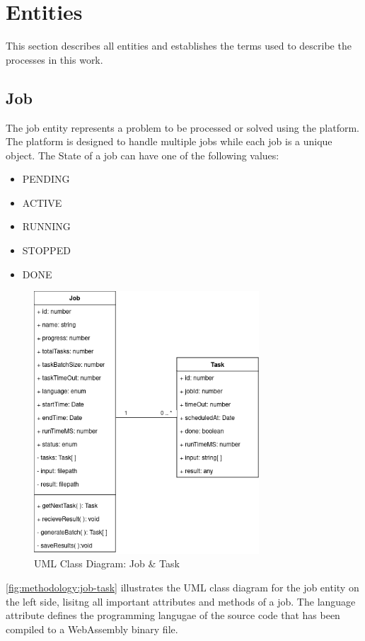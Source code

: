 \section{Entities}
\label{sec:methodology:entities}
This section describes all entities and establishes the terms used to describe the processes in this work.

\subsection{Job}
\label{subsec:methodology:entities:job}
The job entity represents a problem to be processed or solved using the platform. The platform is designed to handle multiple jobs while each job is a unique object. The State of a job can have one of the following values:
\begin{itemize}
  \item PENDING
  \item ACTIVE
  \item RUNNING
  \item STOPPED
  \item DONE
\end{itemize}
\begin{figure}[htbp]
  \centering
  \includegraphics[width=0.75\textwidth]{gfx/figures/Job-Task.png}
  \caption{\ac{UML} Class Diagram: Job \& Task}
  \label{fig:methodology:job-task}
\end{figure}
\autoref{fig:methodology:job-task} illustrates the \ac{UML} class diagram for the job entity on the left side, lisitng all important attributes and methods of a job. The language attribute defines the programming langugae of the source code that has been compiled to a WebAssembly binary file.

